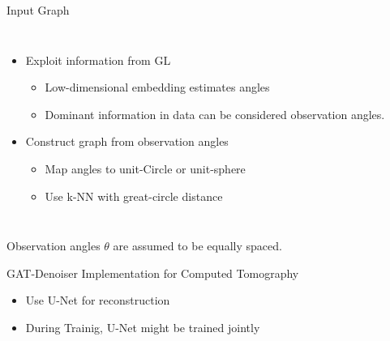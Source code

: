 \begin{frame}{Input Graph}
  \pause
  \begin{columns}
    \begin{itemize}
      \item Exploit information from GL
      \begin{itemize}
        \item Low-dimensional embedding estimates angles
        \item Dominant information in data can be considered observation angles.
      \end{itemize}
      \item<3-> \alert<3>{Construct graph from observation angles}
      \begin{itemize}
        \item<4-> Map angles to unit-Circle or unit-sphere
        \item<5-> Use k-NN with great-circle distance
      \end{itemize}
    \end{itemize}


    
  \end{columns}
  

  \begin{tcolorbox}[colback=red!5!white,hide=<1-5>, alert=<6>, colframe=red!75!black]
    Observation angles $\theta$ are assumed to be equally spaced.
\end{tcolorbox}
\end{frame}


\begin{frame}{GAT-Denoiser Implementation for Computed Tomography}
  \begin{itemize}
    \item Use U-Net for reconstruction
    \item During Trainig, U-Net might be trained jointly
  \end{itemize}
\end{frame}

